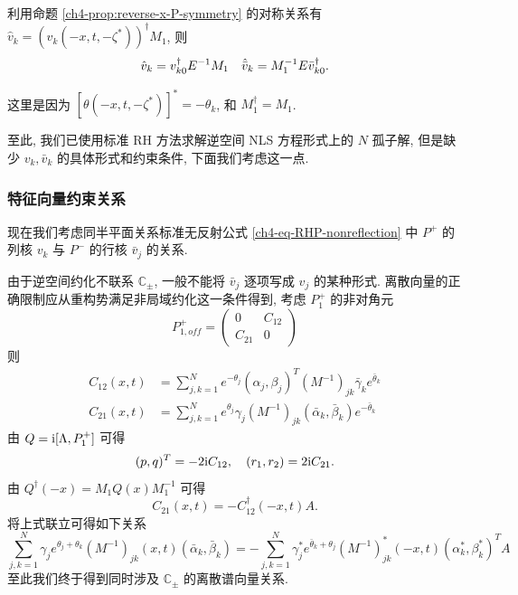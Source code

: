 利用命题 \ref{ch4-prop:reverse-x-P-symmetry} 的对称关系有 $\hat{v}_{k} = (v_{k}(-x,t,-\zeta^{*}))^{\dagger} M_{1}$, 则
\begin{equation}
    \hat{v}_{k} = v_{k0}^{\dagger} E^{-1} M_{1} \quad \hat{\bar{v}}_{k} = M_{1}^{-1} E \bar{v}_{k0}^{\dagger}.
\end{equation}

\begin{remark}
    这里是因为 $[\theta(-x,t,-\zeta^{*})]^{*} = -\theta_{k}$, 和 $M_{1}^\dagger = M_{1}$.
\end{remark}
至此, 我们已使用标准 RH 方法求解逆空间 NLS 方程形式上的 $N$ 孤子解, 但是缺少 $v_{k}, \bar{v}_{k}$ 的具体形式和约束条件, 下面我们考虑这一点.

\subsubsection{特征向量约束关系}\label{ch4-sec-reverse-x-discrete-spectrum-relation}
现在我们考虑同半平面关系标准无反射公式 \eqref{ch4-eq-RHP-nonreflection} 中 $P^{+}$ 的列核 $v_{k}$ 与 $P^{-}$ 的行核 $\bar v_{j}$ 的关系.

由于逆空间约化不联系 $\mathbb{C}_{\pm}$, 一般不能将 $\bar v_{j}$ 逐项写成 $v_{j}$ 的某种形式. 离散向量的正确限制应从重构势满足非局域约化这一条件得到, 考虑 $P_{1}^{+}$ 的非对角元
\begin{equation}
    P_{1,off}^{+} = \begin{pmatrix}
        0 & C_{12} \\ C_{21} & 0
    \end{pmatrix}
\end{equation}
则
\begin{equation}
    \begin{aligned}
        C_{12}(x,t) & = \sum_{j,k=1}^{N} e^{-\theta_{j}} (\alpha_{j}, \beta_{j})^{T} (M^{-1})_{jk} \bar{\gamma}_{k}  e^{\bar{\theta}_{k}}  \\
        C_{21}(x,t) & = \sum_{j,k=1}^{N} e^{\theta_{j}} \gamma_{j} (M^{-1})_{jk} (\bar{\alpha}_{k}, \bar{\beta}_{k}) e^{-\bar{\theta}_{k}}
    \end{aligned}
\end{equation}
由 $Q = \mathrm{i} [\Lambda, P_{1}^{+}]$ 可得
\begin{equation}
    (p, q)^{T}= -2 \mathrm{i} C_{12}, \quad (r_{1}, r_{2}) = 2 \mathrm{i} C_{21}.
\end{equation}
由 $Q^{\dagger}(-x) = M_{1} Q(x) M_{1}^{-1}$ 可得
\begin{equation}
    C_{21}(x,t) = - C_{12}^{\dagger}(-x,t) A.
    \label{ch4-eq-reverse-x-discrete-spectrum-relation}
\end{equation}
将上式联立可得如下关系
\begin{equation}
    \sum_{j,k=1}^{N} \gamma_{j} e^{\theta_{j} + \theta_{k}} (M^{-1})_{jk}(x,t) (\bar{\alpha}_{k}, \bar{\beta}_{k}) =
    -\sum_{j,k=1}^{N} \gamma_{j}^{*} e^{\bar{\theta}_{k} + \theta_{j}} (M^{-1})_{jk}^{*}(-x,t) (\alpha_{k}^{*}, \beta_{k}^{*})^{T} A
    \label{ch4-eq-reverse-x-discrete-spectrum-relation-1}
\end{equation}
至此我们终于得到同时涉及 $\mathbb{C}_{\pm}$ 的离散谱向量关系.
